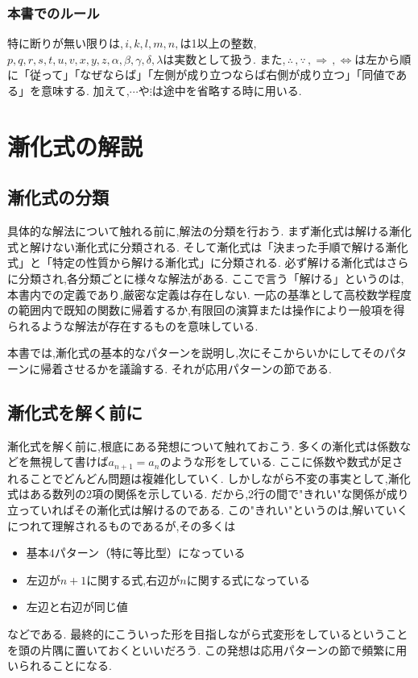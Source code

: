 \documentclass[dvipdfmx,a4paper,11pt,fleqn,openany]{jsbook}
\begin{document}
    \subsection{本書でのルール}
      特に断りが無い限りは,\,$i,k,l,m,n,$は1以上の整数,\,$p,q,r,s,t,u,v,x,y,z,\alpha,\beta,\gamma,\delta,\lambda$は実数として扱う.
      また,\,$\therefore\,,\because\,,\Rightarrow\,,\Leftrightarrow$は左から順に「従って」「なぜならば」「左側が成り立つならば右側が成り立つ」「同値である」を意味する.
      加えて,$\cdots$や$\vdots$は途中を省略する時に用いる.

\chapter{漸化式の解説}
  \section{漸化式の分類}
    具体的な解法について触れる前に,解法の分類を行おう.
    まず漸化式は解ける漸化式と解けない漸化式に分類される.
    そして漸化式は「決まった手順で解ける漸化式」と「特定の性質から解ける漸化式」に分類される.
    必ず解ける漸化式はさらに分類され,各分類ごとに様々な解法がある.
    ここで言う「解ける」というのは,本書内での定義であり,厳密な定義は存在しない.
    一応の基準として高校数学程度の範囲内で既知の関数に帰着するか,有限回の演算または操作により一般項を得られるような解法が存在するものを意味している.

    本書では,漸化式の基本的なパターンを説明し,次にそこからいかにしてそのパターンに帰着させるかを議論する.
    それが応用パターンの節である.

  \section{漸化式を解く前に}\label{sec:before}
    漸化式を解く前に,根底にある発想について触れておこう.
    多くの漸化式は係数などを無視して書けば$a_{n+1}=a_n$のような形をしている.
    ここに係数や数式が足されることでどんどん問題は複雑化していく.
    しかしながら不変の事実として,漸化式はある数列の2項の関係を示している.
    だから,2行の間で"きれい"な関係が成り立っていればその漸化式は解けるのである.
    この"きれい"というのは,解いていくにつれて理解されるものであるが,その多くは
    \begin{itemize}
      \item 基本4パターン（特に等比型）になっている
      \item 左辺が$n+1$に関する式,右辺が$n$に関する式になっている
      \item 左辺と右辺が同じ値
    \end{itemize}
    などである.
    最終的にこういった形を目指しながら式変形をしているということを頭の片隅に置いておくといいだろう.
    この発想は応用パターンの節で頻繁に用いられることになる.
\end{document}
